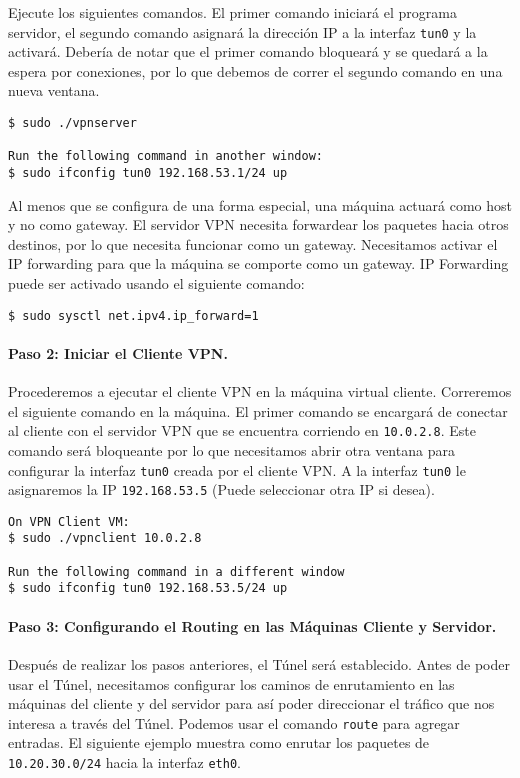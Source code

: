 Ejecute los siguientes comandos. El primer comando iniciará el programa servidor, el segundo comando asignará la dirección IP a la interfaz \texttt{tun0} y la activará. Debería de notar que el primer comando bloqueará y se quedará a la espera por conexiones, por lo que debemos de correr el segundo comando en una nueva ventana.


\begin{lstlisting}
$ sudo ./vpnserver

Run the following command in another window:
$ sudo ifconfig tun0 192.168.53.1/24 up
\end{lstlisting}

Al menos que se configura de una forma especial, una máquina actuará como host y no como gateway. El servidor VPN necesita forwardear los paquetes hacia otros destinos, por lo que necesita funcionar como un gateway. Necesitamos activar el IP forwarding para que la máquina se comporte como un gateway.
IP Forwarding puede ser activado usando el siguiente comando:


\begin{lstlisting}
$ sudo sysctl net.ipv4.ip_forward=1
\end{lstlisting}


\paragraph{Paso 2: Iniciar el Cliente VPN.} 
Procederemos a ejecutar el cliente VPN en la máquina virtual cliente. Correremos el siguiente comando en la máquina. El primer comando se encargará de conectar al cliente con el servidor VPN que se encuentra corriendo en {\tt 10.0.2.8}. Este comando será bloqueante por lo que necesitamos abrir otra ventana para configurar la interfaz \texttt{tun0} creada por el cliente VPN.
A la interfaz \texttt{tun0} le asignaremos la IP \texttt{192.168.53.5} (Puede seleccionar otra IP si desea).


\begin{lstlisting}
On VPN Client VM:
$ sudo ./vpnclient 10.0.2.8

Run the following command in a different window
$ sudo ifconfig tun0 192.168.53.5/24 up
\end{lstlisting}



\paragraph{Paso 3: Configurando el Routing en las Máquinas Cliente y Servidor.}
Después de realizar los pasos anteriores, el Túnel será establecido.
Antes de poder usar el Túnel, necesitamos configurar los caminos de enrutamiento en las máquinas del cliente y del servidor para así poder direccionar el tráfico que nos interesa a través del Túnel.
Podemos usar el comando \texttt{route} para agregar entradas. El siguiente ejemplo muestra como enrutar los paquetes de \texttt{10.20.30.0/24} hacia la interfaz \texttt{eth0}.



